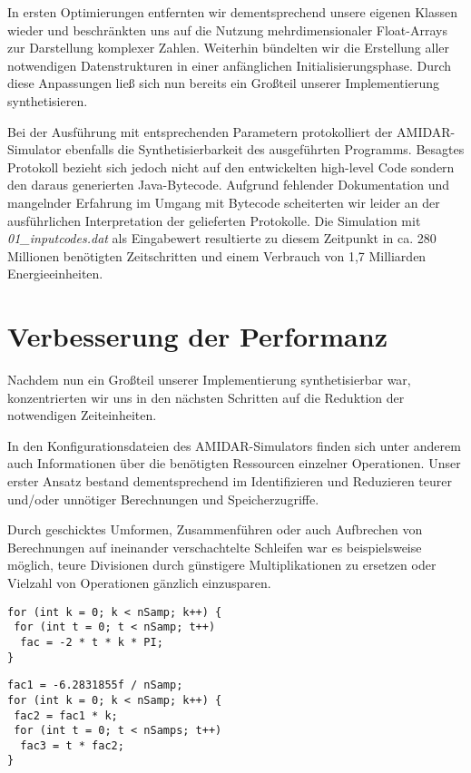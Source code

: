 \documentclass[parskip,
							 oneside,
							 11pt,
							 noheadingspace,
							 accentcolor=tud1d,
							 bigchapter,
							 colorback]{tudreport}
\begin{document}
In ersten Optimierungen entfernten wir dementsprechend unsere eigenen Klassen wieder und beschränkten uns auf die Nutzung mehrdimensionaler Float-Arrays zur Darstellung komplexer Zahlen. Weiterhin bündelten wir die Erstellung aller notwendigen Datenstrukturen in einer anfänglichen Initialisierungsphase. Durch diese Anpassungen ließ sich nun bereits ein Großteil unserer Implementierung synthetisieren. 

Bei der Ausführung mit entsprechenden Parametern protokolliert der AMIDAR-Simulator ebenfalls die Synthetisierbarkeit des ausgeführten Programms. Besagtes Protokoll bezieht sich jedoch nicht auf den entwickelten high-level Code sondern den daraus generierten Java-Bytecode. Aufgrund fehlender Dokumentation und mangelnder Erfahrung im Umgang mit Bytecode scheiterten wir leider an der ausführlichen Interpretation der gelieferten Protokolle. Die Simulation mit \emph{01\_inputcodes.dat} als Eingabewert resultierte zu diesem Zeitpunkt in ca. 280 Millionen benötigten Zeitschritten und einem Verbrauch von 1,7 Milliarden Energieeinheiten.

\section{Verbesserung der Performanz}
Nachdem nun ein Großteil unserer Implementierung synthetisierbar war, konzentrierten wir uns in den nächsten Schritten auf die Reduktion der notwendigen Zeiteinheiten. 

In den Konfigurationsdateien des AMIDAR-Simulators finden sich unter anderem auch Informationen über die benötigten Ressourcen einzelner Operationen. Unser erster Ansatz bestand dementsprechend im Identifizieren und Reduzieren teurer und/oder unnötiger Berechnungen und Speicherzugriffe.

Durch geschicktes Umformen, Zusammenführen oder auch Aufbrechen von Berechnungen auf ineinander verschachtelte Schleifen war es beispielsweise möglich, teure Divisionen durch günstigere Multiplikationen zu ersetzen oder Vielzahl von Operationen gänzlich einzusparen.


\noindent
\begin{minipage}[t]{.49\textwidth}
\hspace*{0pt}
\begin{lstlisting}[basicstyle=\small, caption = Ohne Umformungen]
for (int k = 0; k < nSamp; k++) { 
 for (int t = 0; t < nSamp; t++) 
  fac = -2 * t * k * PI;
}
\end{lstlisting}
\end{minipage}
\hfill
\begin{minipage}[t]{.49\textwidth}
\hspace*{0pt}
\begin{lstlisting}[basicstyle=\small, caption= Optimierte Berechnungen]
fac1 = -6.2831855f / nSamp;
for (int k = 0; k < nSamp; k++) { 
 fac2 = fac1 * k; 
 for (int t = 0; t < nSamps; t++) 
  fac3 = t * fac2;
}
\end{lstlisting}
\end{minipage}
\end{document}
